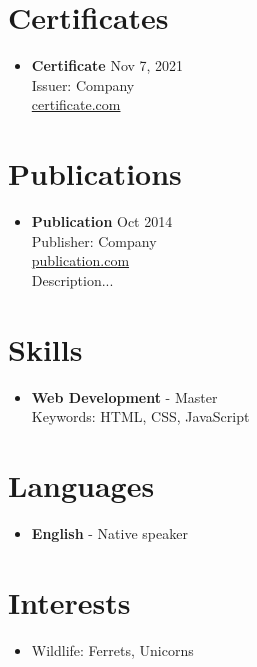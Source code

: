 \documentclass{article}
\begin{document}
\section*{Certificates}
\begin{itemize}[leftmargin=*]
    \item \textbf{Certificate} \hfill Nov 7, 2021 \\
    Issuer: Company \\
    \href{https://certificate.com}{certificate.com}
\end{itemize}

\section*{Publications}
\begin{itemize}[leftmargin=*]
    \item \textbf{Publication} \hfill Oct 2014 \\
    Publisher: Company \\
    \href{https://publication.com}{publication.com} \\
    Description...
\end{itemize}

\section*{Skills}
\begin{itemize}[leftmargin=*]
    \item \textbf{Web Development} - Master \\
    Keywords: HTML, CSS, JavaScript
\end{itemize}

\section*{Languages}
\begin{itemize}[leftmargin=*]
    \item \textbf{English} - Native speaker
\end{itemize}

\section*{Interests}
\begin{itemize}[leftmargin=*]
    \item Wildlife: Ferrets, Unicorns
\end{itemize}
\end{document}
